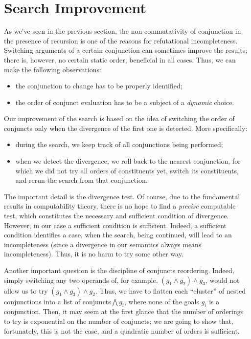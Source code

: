 \section{Search Improvement}
\label{improvement}

As we've seen in the previous section, the non-commutativity of conjunction in the presence of recursion
is one of the reasons for refutational incompleteness. Switching arguments of a certain conjunction
can sometimes improve the results; there is, however, no certain static order, beneficial in all cases.
Thus, we can make the following observations:

\begin{itemize}
\item the conjunction to change has to be properly identified;
\item the order of conjunct evaluation has to be a subject of a \emph{dynamic} choice.
\end{itemize}

Our improvement of the search is based on the idea of switching the order of conjuncts only when
the divergence of the first one is detected. More specifically: 

\begin{itemize}
\item during the search, we keep track of all conjunctions being performed;
\item when we detect the divergence, we roll back to the nearest conjunction, for which 
we did not try all orders of constituents yet, switch its constituents, and rerun 
the search from that conjunction.
\end{itemize}

The important detail is the divergence test. Of course, due to the fundamental results in computability
theory, there is no hope to find a \emph{precise} computable test, which constitutes the necessary and 
sufficient condition of divergence. However, in our case a sufficient condition is sufficient. Indeed,  
a sufficient condition identifies a case, when the search, being continued, will lead to an incompleteness 
(since a divergence in our semantics always means incompleteness). Thus, it is no harm to try some other way. 

Another important question is the discipline of conjuncts reordering. Indeed, simply switching any two operands
of, for example, \mbox{$(g_1\wedge g_2)\wedge g_3$}, would not allow us to try \mbox{$(g_1\wedge g_3)\wedge g_2$}.
Thus, we have to flatten each ``cluster'' of nested conjunctions into a list of conjuncts\mbox{$\bigwedge g_i$}, 
where none of the goals $g_i$ is a conjunction. Then, it may seem at the first glance that the number of orderings to try 
is exponential on the number of conjuncts; we are going to show that, fortunately, this is not the case, and
a quadratic number of orders is sufficient.

